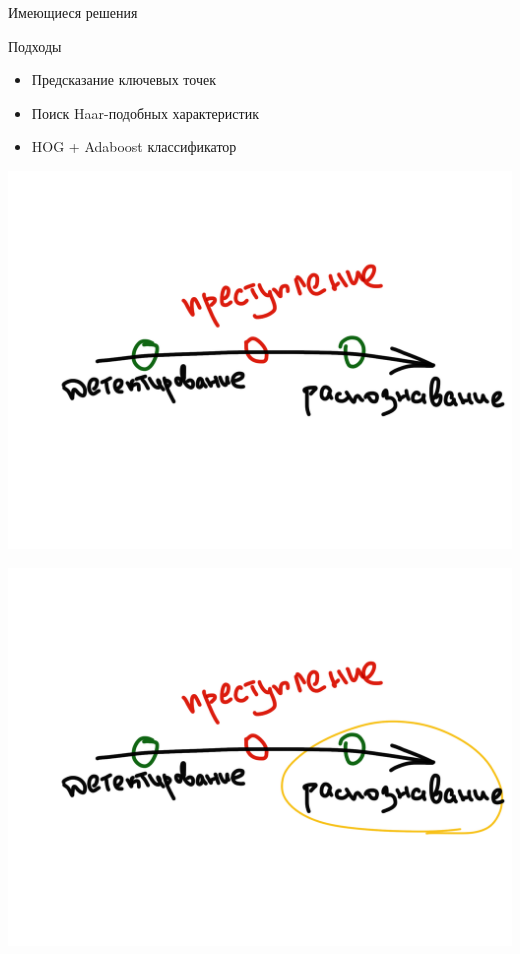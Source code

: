 \documentclass[
  russian,
  ignorenonframetext,
]{beamer}
\providecommand{\tightlist}{%
  \setlength{\itemsep}{0pt}\setlength{\parskip}{0pt}}
\begin{document}
\begin{frame}
\begin{block}{Имеющиеся решения}
\begin{block}{Подходы}
\begin{itemize}
\tightlist
\item
  Предсказание ключевых точек
\item
  Поиск Haar-подобных характеристик
\item
  HOG + Adaboost классификатор
\end{itemize}

\end{block}

\begin{block}{}

\includegraphics{pics/timeline.png}

\end{block}

\begin{block}{}

\includegraphics{pics/recogn.png}


\end{block}
\end{block}
\end{frame}
\end{document}
